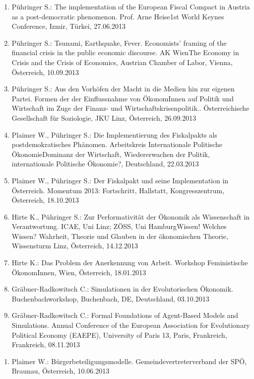 \begin{enumerate}
	\item Pühringer S.: The implementation of the European Fiscal Compact in Austria as a post-democratic phenomenon. Prof. Arne Heise1st World Keynes Conference, Izmir, Türkei, 27.06.2013
	\item Pühringer S.: Tsunami, Earthquake, Fever. Economists’ framing of the financial crisis in the public economic discourse. AK WienThe Economy in Crisis and the Crisis of Economics, Austrian Chamber of Labor, Vienna, Österreich, 10.09.2013
	\item Pühringer S.: Aus den Vorhöfen der Macht in die Medien hin zur eigenen Partei. Formen der der Einflussnahme von ÖkonomInnen auf Politik und Wirtschaft im Zuge der Finanz- und Wirtschaftskrisenpolitik.. Österreichische Gesellschaft für Soziologie, JKU Linz, Österreich, 26.09.2013
	\item Plaimer W., Pühringer S.: Die Implementierung des Fiskalpakts als postdemokratisches Phänomen. Arbeitskreis Internationale Politische ÖkonomieDominanz der Wirtschaft, Wiedererwachen der Politik, internationale Politische Ökonomie?, Deutschland, 22.03.2013
	\item Plaimer W., Pühringer S.: Der Fiskalpakt und seine Implementation in Österreich. Momentum 2013: Fortschritt, Hallstatt, Kongresszentrum, Österreich, 18.10.2013
	\item Hirte K., Pühringer S.: Zur Performativität der Ökonomik als Wissenschaft in Verantwortung. ICAE, Uni Linz; ZÖSS, Uni HamburgWissen! Welches Wissen? Wahrheit, Theorie und Glauben in der ökonomischen Theorie, Wissensturm Linz, Österreich, 14.12.2013
	\item Hirte K.: Das Problem der Anerkennung von Arbeit. Workshop Feministische ÖkonomInnen, Wien, Österreich, 18.01.2013
	\item Gräbner-Radkowitsch C.: Simulationen in der Evolutorischen Ökonomik. Buchenbachworkshop, Buchenbach, DE, Deutschland, 03.10.2013
	\item Gräbner-Radkowitsch C.: Formal Foundations of Agent-Based Models and Simulations. Annual Conference of the European Association for Evolutionary Political Economy (EAEPE), University of Paris 13, Paris, Frankreich, Frankreich, 08.11.2013
\end{enumerate}

\begin{enumerate}
	\item Plaimer W.: Bürgerbeteiligungsmodelle. Gemeindevertreterverband der SPÖ, Braunau, Österreich, 10.06.2013
\end{enumerate}

